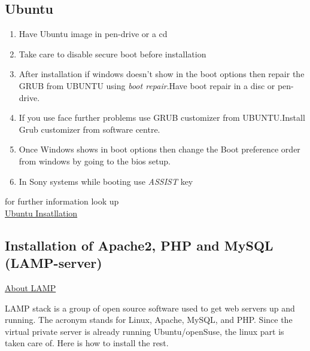 \documentclass[16pt]{article}
\begin{document}
\vspace{1cm}                                    %


 
\subsection{Ubuntu}

\hfill
  \begin{enumerate}
  \item
    Have Ubuntu image in pen-drive or a cd
  \item
    Take care to disable secure boot before installation
  \item
    After installation if windows doesn't show in the boot options then
    repair the GRUB from UBUNTU using \emph{boot repair}.Have boot repair in a disc or pen-drive.
  \item
    If you use face further problems use GRUB customizer from UBUNTU.Install Grub customizer from software centre.
  \item
    Once Windows shows in boot options then change the Boot preference
    order from windows by going to the bios setup.
  \item
    In Sony systems while booting use \emph{ASSIST} key
  \end{enumerate}
  
for further information look up \\

{\color{red}\href{https://help.ubuntu.com/community/WindowsDualBoot}{Ubuntu Insatllation}}
  
\hfill


\subsection{Installation of Apache2, PHP and MySQL (LAMP-server)}

\vspace{0.5cm}

{\underline{\Large{About LAMP}}}

  LAMP stack is a group of open source software used to get web servers up
  and running. The acronym stands for Linux, Apache, MySQL, and PHP. Since
  the virtual private server is already running Ubuntu/openSuse, the linux
  part is taken care of. Here is how to install the rest.


  
  

  
\end{document}
